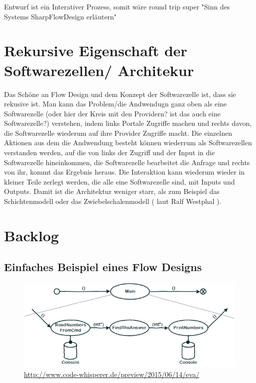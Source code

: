 \documentclass[11pt]{article}
\begin{document}
Entwurf ist ein Interativer Prozess, somit wäre round trip super "Sinn des Systems SharpFlowDesign erläutern"



\section{Rekursive Eigenschaft der Softwarezellen/ Architekur}
\label{sec:orgheadline50}
Das Schöne an Flow Design und dem Konzept der Softwarezelle ist, dass sie rekusive ist.
Man kann das Problem/die Andwendugn ganz oben als eine Softwarezelle (oder hier der Kreis mit den Providern? ist das auch eine Softwarezelle?)
verstehen, indem links Portale Zugriffe machen und rechts davon, die Softwarezelle wiederum auf ihre Provider Zugriffe macht.
Die einzelnen Aktionen aus dem die Andwendung besteht können wiederrum als Softwarezellen verstanden werden, auf die von links 
der Zugriff und der Input in die Softwarezelle hineinkommen, die Softwarezelle bearbeitet die Anfrage und rechts von ihr, kommt das
Ergebnis heraus. Die Interaktion kann wiederum wieder in kleiner Teile zerlegt werden, die alle eine Softwarezelle sind, mit Inputs und
Outputs. Damit ist die Architektur weniger starr, als zum Beispiel das Schichtenmodell oder das Zwiebelschalenmodell ( laut Ralf Westphal ). 



\section{Backlog}
\label{sec:orgheadline55}
\subsection{Einfaches Beispiel eines Flow Designs}
\label{sec:orgheadline54}
\begin{figure}[htb]
\centering
\includegraphics[width=.9\linewidth]{./img/FlowDesign2.png}
\caption{\url{http://www.code-whisperer.de/preview/2015/06/14/eva/}}
\end{figure}
\end{document}
